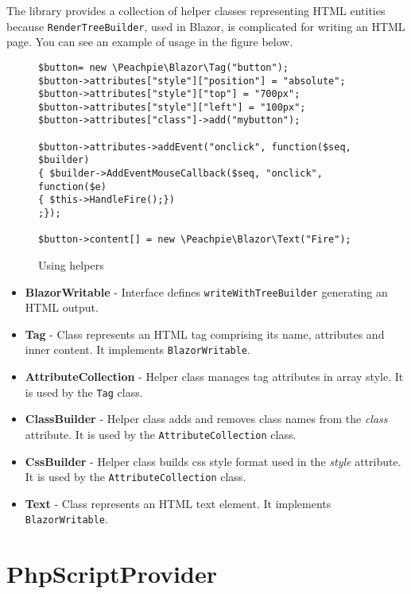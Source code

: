 The library provides a collection of helper classes representing HTML entities because \texttt{RenderTreeBuilder}, used in Blazor, is complicated for writing an HTML page. You can see an example of usage in the figure below.
\par
\begin{figure}[H]
\begin{lstlisting}
$button= new \Peachpie\Blazor\Tag("button");
$button->attributes["style"]["position"] = "absolute";
$button->attributes["style"]["top"] = "700px";
$button->attributes["style"]["left"] = "100px";
$button->attributes["class"]->add("mybutton");        
        
$button->attributes->addEvent("onclick", function($seq, $builder) 
{ $builder->AddEventMouseCallback($seq, "onclick", function($e) 
{ $this->HandleFire();})
;});
        
$button->content[] = new \Peachpie\Blazor\Text("Fire");
\end{lstlisting}
\caption{Using helpers}
\label{img36:helpers}
\end{figure}
\par
\begin{itemize}
\item \textbf{BlazorWritable} - Interface defines \texttt{writeWithTreeBuilder} generating an HTML output. 
\item \textbf{Tag} - Class represents an HTML tag comprising its name, attributes and inner content. It implements \texttt{BlazorWritable}.  
\item \textbf{AttributeCollection} - Helper class manages tag attributes in array style. It is used by the \texttt{Tag} class.
\item \textbf{ClassBuilder} - Helper class adds and removes class names from the \textit{class} attribute. It is used by the \texttt{AttributeCollection} class.  
\item \textbf{CssBuilder} - Helper class builds css style format used in the \textit{style} attribute. It is used by the \texttt{AttributeCollection} class.  
\item \textbf{Text} - Class represents an HTML text element. It implements \texttt{BlazorWritable}.  
\end{itemize}
\par

\section{PhpScriptProvider}

